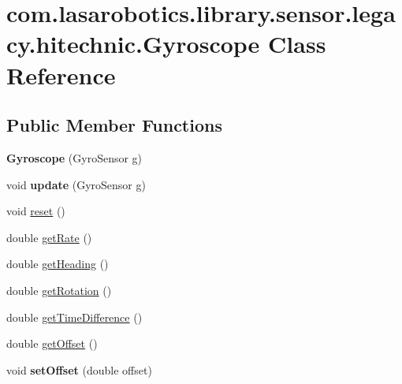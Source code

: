 \hypertarget{classcom_1_1lasarobotics_1_1library_1_1sensor_1_1legacy_1_1hitechnic_1_1_gyroscope}{}\section{com.\+lasarobotics.\+library.\+sensor.\+legacy.\+hitechnic.\+Gyroscope Class Reference}
\label{classcom_1_1lasarobotics_1_1library_1_1sensor_1_1legacy_1_1hitechnic_1_1_gyroscope}
\subsection*{Public Member Functions}
\begin{DoxyCompactItemize}
\item 
\hypertarget{classcom_1_1lasarobotics_1_1library_1_1sensor_1_1legacy_1_1hitechnic_1_1_gyroscope_a560e1f991f1fc3e23ce6859a01462682}{}{\bfseries Gyroscope} (Gyro\+Sensor g)\label{classcom_1_1lasarobotics_1_1library_1_1sensor_1_1legacy_1_1hitechnic_1_1_gyroscope_a560e1f991f1fc3e23ce6859a01462682}

\item 
\hypertarget{classcom_1_1lasarobotics_1_1library_1_1sensor_1_1legacy_1_1hitechnic_1_1_gyroscope_ab19083c7d24dbe3289e5f09823ae5358}{}void {\bfseries update} (Gyro\+Sensor g)\label{classcom_1_1lasarobotics_1_1library_1_1sensor_1_1legacy_1_1hitechnic_1_1_gyroscope_ab19083c7d24dbe3289e5f09823ae5358}

\item 
void \hyperlink{classcom_1_1lasarobotics_1_1library_1_1sensor_1_1legacy_1_1hitechnic_1_1_gyroscope_a6c6937976f168cb48ba03cefaff23f30}{reset} ()
\item 
double \hyperlink{classcom_1_1lasarobotics_1_1library_1_1sensor_1_1legacy_1_1hitechnic_1_1_gyroscope_a1f8218ae8afe2a10f64420fd753f47e7}{get\+Rate} ()
\item 
double \hyperlink{classcom_1_1lasarobotics_1_1library_1_1sensor_1_1legacy_1_1hitechnic_1_1_gyroscope_a14c2d2d823cba6687e64d001fbdc6a7e}{get\+Heading} ()
\item 
double \hyperlink{classcom_1_1lasarobotics_1_1library_1_1sensor_1_1legacy_1_1hitechnic_1_1_gyroscope_af80ec3a6a4126757943abe9c83c81950}{get\+Rotation} ()
\item 
double \hyperlink{classcom_1_1lasarobotics_1_1library_1_1sensor_1_1legacy_1_1hitechnic_1_1_gyroscope_ab78c5038a63250b432ac2e98220642f6}{get\+Time\+Difference} ()
\item 
double \hyperlink{classcom_1_1lasarobotics_1_1library_1_1sensor_1_1legacy_1_1hitechnic_1_1_gyroscope_af0dd85696fe27b31f6c70d08c4135f2a}{get\+Offset} ()
\item 
\hypertarget{classcom_1_1lasarobotics_1_1library_1_1sensor_1_1legacy_1_1hitechnic_1_1_gyroscope_a07c16e78f614ecee303f761321aad858}{}void {\bfseries set\+Offset} (double offset)\label{classcom_1_1lasarobotics_1_1library_1_1sensor_1_1legacy_1_1hitechnic_1_1_gyroscope_a07c16e78f614ecee303f761321aad858}


\end{DoxyCompactItemize}
